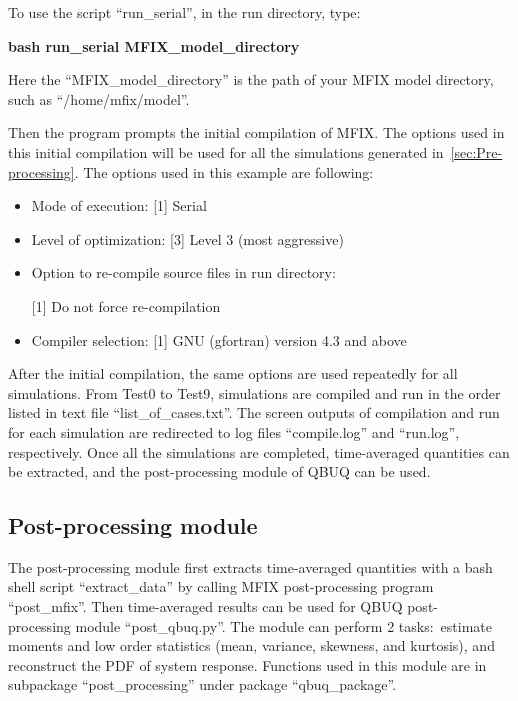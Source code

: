 \documentclass[a4paper,12pt,titlepage]{article}
\begin{document}
To use the script ``run\_serial'', in the run directory, type:

\textbf{bash run\_serial MFIX\_model\_directory}

Here the ``MFIX\_model\_directory'' is the path of your MFIX model directory, 
such as ``/home/mfix/model''.

Then the program prompts the initial compilation of MFIX. The options used in 
this initial compilation will be used for all the simulations generated 
in~\ref{sec:Pre-processing}. The options used in this example are following:

\begin{itemize}
 \item Mode of execution: [1] Serial
 \item Level of optimization: [3] Level 3 (most aggressive)
 \item Option to re-compile source files in run directory: 
 
 [1] Do not force re-compilation
 \item Compiler selection: [1] GNU (gfortran) version 4.3 and above
\end{itemize}

After the initial compilation, the same options are used repeatedly for all 
simulations. From Test0 to Test9, simulations are compiled and run in the order
listed in text file ``list\_of\_cases.txt''. The screen outputs of compilation 
and run for each simulation are redirected to log files ``compile.log'' and
``run.log'', respectively. Once all the simulations are completed, time-averaged 
quantities can be extracted, and the post-processing module of QBUQ can be used.

\subsection{Post-processing module}
\label{sec:Post-processing}

The post-processing module first extracts time-averaged quantities with a bash
shell script ``extract\_data'' by calling MFIX post-processing program 
``post\_mfix''. Then time-averaged results can be used for QBUQ post-\\processing 
module ``post\_qbuq.py''. The module can perform 2 tasks:\ estimate moments and 
low order statistics (mean, variance, skewness, and kurtosis), and reconstruct 
the PDF of system response. Functions used in this module are in subpackage 
``post\_processing'' under package ``qbuq\_package''.
\end{document}
